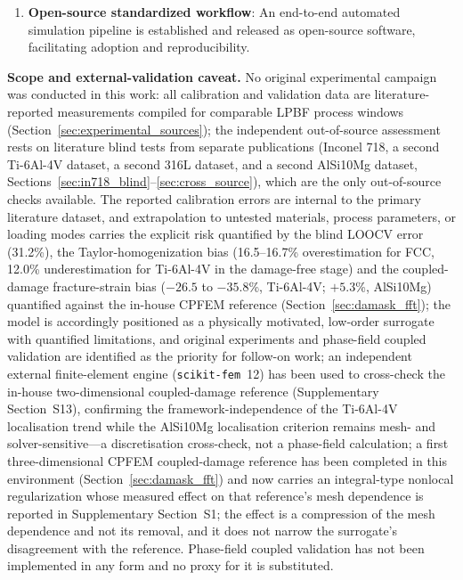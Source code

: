 \documentclass[12pt,a4paper,twocolumn]{article}
\begin{document}
\begin{enumerate}
    \item \textbf{Open-source standardized workflow}: An end-to-end automated simulation pipeline is established and released as open-source software, facilitating adoption and reproducibility.
\end{enumerate}

\textbf{Scope and external-validation caveat.} No original experimental campaign was conducted in this work: all calibration and validation data are literature-reported measurements compiled for comparable LPBF process windows (Section~\ref{sec:experimental_sources}); the independent out-of-source assessment rests on literature blind tests from separate publications (Inconel 718, a second Ti-6Al-4V dataset, a second 316L dataset, and a second AlSi10Mg dataset, Sections~\ref{sec:in718_blind}--\ref{sec:cross_source}), which are the only out-of-source checks available. The reported calibration errors are internal to the primary literature dataset, and extrapolation to untested materials, process parameters, or loading modes carries the explicit risk quantified by the blind LOOCV error (31.2\%), the Taylor-homogenization bias (16.5--16.7\% overestimation for FCC, 12.0\% underestimation for Ti-6Al-4V in the damage-free stage) and the coupled-damage fracture-strain bias ($-26.5$ to $-35.8$\%, Ti-6Al-4V; $+5.3$\%, AlSi10Mg) quantified against the in-house CPFEM reference (Section~\ref{sec:damask_fft}); the model is accordingly positioned as a physically motivated, low-order surrogate with quantified limitations, and original experiments and phase-field coupled validation are identified as the priority for follow-on work; an independent external finite-element engine (\texttt{scikit-fem}~12) has been used to cross-check the in-house two-dimensional coupled-damage reference (Supplementary Section~S13), confirming the framework-independence of the Ti-6Al-4V localisation trend while the AlSi10Mg localisation criterion remains mesh- and solver-sensitive---a discretisation cross-check, not a phase-field calculation; a first three-dimensional CPFEM coupled-damage reference has been completed in this environment (Section~\ref{sec:damask_fft}) and now carries an integral-type nonlocal regularization whose measured effect on that reference's mesh dependence is reported in Supplementary Section~S1; the effect is a compression of the mesh dependence and not its removal, and it does not narrow the surrogate's disagreement with the reference. Phase-field coupled validation has not been implemented in any form and no proxy for it is substituted.
\end{document}
